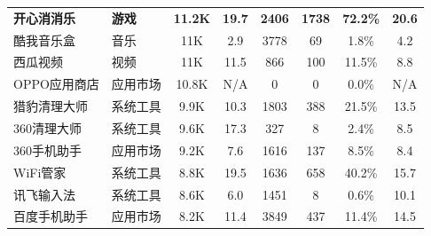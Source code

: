 \begin{ThreePartTable}
\begin{longtable}{l l c c c c c c}
        \rowcolor{gray!15} {\bf 开心消消乐}\tnote{*} & {\bf 游戏}     & {\bf 11.2K}                & {\bf 19.7}                 & {\bf 2406}     & {\bf 1738}                 & {\bf 72.2\%} & {\bf 20.6}                 \\
        酷我音乐盒                                   & 音乐           & 11K                        & 2.9                        & 3778           & 69                         & 1.8\%        & 4.2                        \\
        \rowcolor{gray!15} 西瓜视频                  & 视频           & 11K                        & 11.5                       & 866            & 100                        & 11.5\%       & 8.8                        \\
        OPPO应用商店                                 & 应用市场       & 10.8K                      & N/A                        & 0              & 0                          & 0.0\%        & N/A                        \\
        \rowcolor{gray!15} 猎豹清理大师              & 系统工具       & 9.9K                       & 10.3                       & 1803           & 388                        & 21.5\%       & 13.5                       \\
        360清理大师                                  & 系统工具       & 9.6K                       & 17.3                       & 327            & 8                          & 2.4\%        & 8.5                        \\
        \rowcolor{gray!15} 360手机助手               & 应用市场       & 9.2K                       & 7.6                        & 1616           & 137                        & 8.5\%        & 8.4                        \\
        WiFi管家                                     & 系统工具       & 8.8K                       & 19.5                       & 1636           & 658                        & 40.2\%       & 15.7                       \\
        \rowcolor{gray!15} 讯飞输入法                & 系统工具       & 8.6K                       & 6.0                        & 1451           & 8                          & 0.6\%        & 10.1                       \\
        百度手机助手                                 & 应用市场       & 8.2K                       & 11.4                       & 3849           & 437                        & 11.4\%       & 14.5                       \\

\end{longtable}
\end{ThreePartTable}
